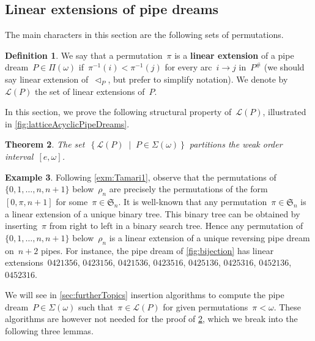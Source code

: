 \documentclass[reqno]{amsart}
\newtheorem{theorem}{Theorem}[section]
\theoremstyle{definition}
\newtheorem{definition}[theorem]{Definition}
\newtheorem{example}[theorem]{Example}
\newcommand{\set}[2]{\left\{ #1 \;\middle|\; #2 \right\}} %
\newcommand{\defn}[1]{\textbf{\textsf{\color{PineGreen} #1}}} %
\newcommand{\fS}{\mathfrak{S}} %
\newcommand{\pipeDreams}{\Pi} %
\newcommand{\contact}{^\#} %
\newcommand{\acyclicPipeDreams}{\Sigma} %
\newcommand{\linearExtensions}{\mathcal{L}} %
\newcommand{\less}{\vartriangleleft} %
\newcommand{\contactLess}[1]{\less_{#1}} %
\begin{document}
\subsection{Linear extensions of pipe dreams}
\label{subsec:linearExtensions}

The main characters in this section are the following sets of permutations.

\begin{definition}
\label{def:linearExtensions}
We say that a permutation~$\pi$ is a \defn{linear extension} of a pipe dream~$P \in \pipeDreams(\omega)$ if~$\pi^{-1}(i) < \pi^{-1}(j)$ for every arc~$i \to j$ in~$P\contact$ (we should say linear extension of~$\contactLess{P}$, but prefer to simplify notation).
We denote by~$\linearExtensions(P)$ the set of linear extensions of~$P$.
\end{definition}

In this section, we prove the following structural property of~$\linearExtensions(P)$, illustrated in \cref{fig:latticeAcyclicPipeDreams}.

\begin{theorem}
\label{thm:partitionPipeDreams}
The set~$\set{\linearExtensions(P)}{P \in \acyclicPipeDreams(\omega)}$ partitions the weak order interval~$[e,\omega]$.
\end{theorem}

\begin{example}
\label{exm:Tamari2}
Following \cref{exm:Tamari1}, observe that the permutations of~$\{0, 1, \dots, n, n+1\}$ below~$\rho_n$ are precisely the permutations of the form~$[0, \pi, n+1]$ for some~$\pi \in \fS_n$.
It is well-known that any permutation~$\pi \in \fS_n$ is a linear extension of a unique binary tree.
This binary tree can be obtained by inserting~$\pi$ from right to left in a binary search tree.
Hence any permutation of~$\{0, 1, \dots, n, n+1\}$ below~$\rho_n$ is a linear extension of a unique reversing pipe dream on~$n+2$ pipes.
For instance, the pipe dream of \cref{fig:bijection} has linear extensions~$0421356$, $0423156$, $0421536$, $0423516$, $0425136$, $0425316$, $0452136$, $0452316$.
\end{example}

We will see in \cref{sec:furtherTopics} insertion algorithms to compute the pipe dream~$P \in \acyclicPipeDreams(\omega)$ such that~$\pi \in \linearExtensions(P)$ for given permutations~$\pi < \omega$.
These algorithms are however not needed for the proof of \cref{thm:partitionPipeDreams}, which we break into the following three lemmas.
\end{document}
